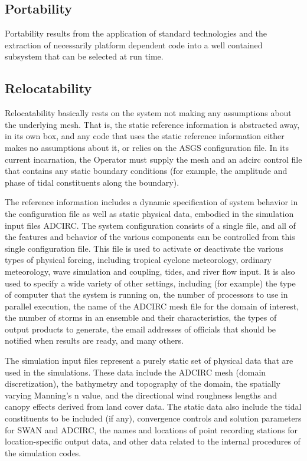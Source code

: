 \documentclass[jmse,article,submit,moreauthors,pdftex,12pt,a4paper]{mdpi}
\begin{document}
\subsection{Portability}

Portability results from the application of standard technologies and
the extraction of necessarily platform dependent code into a well 
contained subsystem that can be selected at run time. 


\subsection{Relocatability}

Relocatability basically rests on the system not making any 
assumptions about the underlying mesh. That is, the static reference 
information is abstracted away, in its own box, and any code that 
uses the static reference information either makes no assumptions 
about it, or relies on the ASGS configuration file. In its current 
incarnation, the Operator must supply the mesh and an adcirc control 
file that contains any static boundary conditions (for example, the 
amplitude and phase of tidal constituents along the boundary). 

The reference information includes a dynamic specification of system 
behavior in the configuration file as well as static physical data, 
embodied in the simulation input files ADCIRC. The system 
configuration consists of a single file, and all of the features and 
behavior of the various components can be controlled from this 
single configuration file. This file is used to activate or 
deactivate the various types of physical forcing, including tropical 
cyclone meteorology, ordinary meteorology, wave simulation and 
coupling, tides, and river flow input. It is also used to specify a 
wide variety of other settings, including (for example) the type of 
computer that the system is running on, the number of processors to 
use in parallel execution, the name of the ADCIRC mesh file for the 
domain of interest, the number of storms in an ensemble and their 
characteristics, the types of output products to generate, the email 
addresses of officials that should be notified when results are 
ready, and many others. 

The simulation input files represent a purely static set of physical 
data that are used in the simulations. These data include the ADCIRC 
mesh (domain discretization), the bathymetry and topography of the 
domain, the spatially varying Manning's n value, and the directional 
wind roughness lengths and canopy effects derived from land cover 
data. The static data also include the tidal constituents to be 
included (if any), convergence controls and solution parameters for 
SWAN and ADCIRC, the names and locations of point recording stations 
for location-specific output data, and other data related to the 
internal procedures of the simulation codes. 
\end{document}
